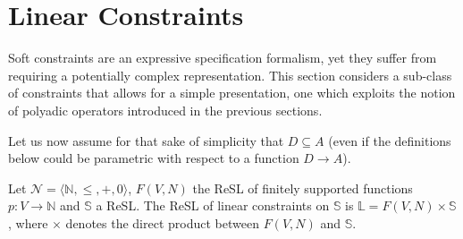 \documentclass{llncs}
\newcommand{\comment}[1]{}
\def\monop{\otimes}
\begin{document}
%


\comment{
Note also that the diagonal elements are not guaranteed to be $\monop$-compact,
even if they have finite support, since $\top$ is not necessarily so.
%
To this end, we close the section by adding the simple result below to the soft constraint lore.

\begin{proposition}
	Let $c \in \mathbb{C}$ be a constraint. It is $\monop$-compact if and only if it has finite support and 
	$c\eta$ is $\monop$-compact for all $\eta$.
\end{proposition}
}

\section{Linear Constraints}\label{sec:polynomialsoftconstraints}
Soft constraints are an expressive specification formalism, yet they 
suffer from requiring a potentially complex representation.
%
This section considers a sub-class of constraints that allows 
for a simple presentation, one which exploits the notion of
polyadic operators introduced in the previous sections.

Let us now assume for that sake of simplicity that $D \subseteq A$ 
(even if the definitions below could be parametric with respect to
a function $D \rightarrow A$).

\comment{
\begin{definition}[Linear constraints]\label{def:softconstraints}
	A \emph{linear constraint} is a pair $\langle p, i \rangle$
	such that $p: V\rightarrow \mathbb{N}$ is a function with 
	finite support and $i\in A$.
\end{definition}
}
%
\begin{definition}\label{def:softconstraints}
	Let $\mathcal{N} = \langle \mathbb{N}, \leq, +, 0 \rangle$, $F(V,N)$ the ReSL of finitely supported functions $p: V \rightarrow \mathbb{N}$ and $\mathbb{S}$ a ReSL.
	The ReSL of linear constraints on $\mathbb{S}$ is $\mathbb{L} = F(V,N) \times \mathbb{S}$, where $\times$ denotes the direct product between $F(V,N)$ and $\mathbb{S}$.
\end{definition}
\end{document}
